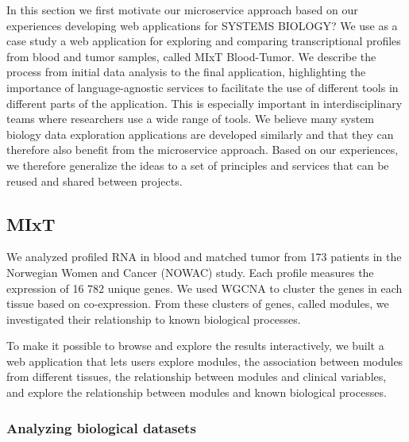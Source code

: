 In this section we first motivate our microservice approach based on our experiences developing web applications for SYSTEMS BIOLOGY? We use as a case study a web application for exploring and comparing transcriptional profiles
from blood and tumor samples, called MIxT Blood-Tumor. 
We describe the process
from initial data analysis to the final application, highlighting the importance
of language-agnostic services to facilitate the use of different tools in
different parts of the application. This is especially important in
interdisciplinary teams where researchers use a wide range of tools. 
We believe
many system biology data exploration applications are developed similarly and
that they can therefore also benefit from the microservice approach. 
Based on our experiences, we therefore generalize the ideas to a set of principles and
services that can be reused and shared between 
projects. 





\subsection*{MIxT} 
We analyzed profiled RNA in blood and matched tumor from 173 patients in the
Norwegian Women and Cancer (NOWAC) study. Each profile measures the expression
of 16 782 unique genes. We used WGCNA\cite{} to cluster the genes in each tissue
based on co-expression. From these clusters of genes, called modules, we
investigated their relationship to known biological processes. 

To make it possible to browse and explore the results interactively, we built a
web application that lets users explore modules, the association between modules
from different tissues, the relationship between modules and clinical variables,
and explore the relationship between modules and known biological processes.

\subsubsection*{Analyzing biological datasets} 

